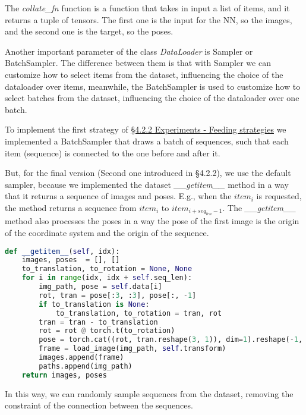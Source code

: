 The \textit{collate\_fn} function is a function that takes in input a list of items, and it returns a tuple of tensors.
The first one is the input for the NN, so the images, and the second one is the target, so the poses.

Another important parameter of the class \textit{DataLoader} is Sampler or BatchSampler.
The difference between them is that with Sampler we can customize how to select items from the dataset, influencing the choice of the dataloader over items, meanwhile, the BatchSampler is used to customize how to select batches from the dataset, influencing the choice of the dataloader over one batch.

To implement the first strategy of \hyperref[]{\S4.2.2 Experiments - Feeding strategies} we implemented a BatchSampler that draws a batch of sequences, such that each item (sequence) is connected to the one before and after it.

But, for the final version (Second one introduced in \S4.2.2), we use the default sampler, because we implemented the dataset \textit{\_\_getitem\_\_} method in a way that it returns a sequence of images and poses.
E.g., when the $item_i$ is requested, the method returns a sequence from $item_i$ to $item_{i + seq_{len}-1}$.
The \textit{\_\_getitem\_\_} method also processes the poses in a way the pose of the first image is the origin of the coordinate system and the origin of the sequence.
\begin{lstlisting}[captionpos=b, language=python,label={lst:dataset-get-item}, caption ={The \textit{\_\_getitem\_\_} method of the \textit{KittiDataset} class.}]
def __getitem__(self, idx):
    images, poses  = [], []
    to_translation, to_rotation = None, None
    for i in range(idx, idx + self.seq_len):
        img_path, pose = self.data[i]
        rot, tran = pose[:3, :3], pose[:, -1]
        if to_translation is None:
            to_translation, to_rotation = tran, rot
        tran = tran - to_translation
        rot = rot @ torch.t(to_rotation)
        pose = torch.cat((rot, tran.reshape(3, 1)), dim=1).reshape(-1, )
        frame = load_image(img_path, self.transform)
        images.append(frame)
        paths.append(img_path)
    return images, poses
\end{lstlisting}
In this way, we can randomly sample sequences from the dataset, removing the constraint of the connection between the sequences.

